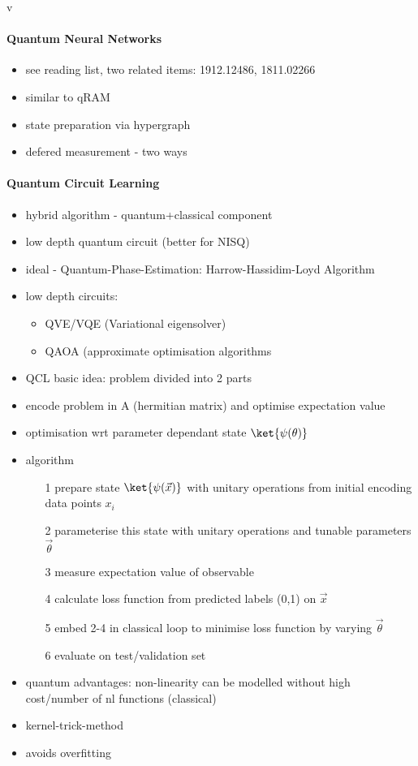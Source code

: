 v

\paragraph{Quantum Neural Networks}
\begin{itemize}
  \item see reading list, two related items: 1912.12486, 1811.02266
  \item similar to qRAM
  \item state preparation via hypergraph
  \item defered measurement - two ways
\end{itemize}

\paragraph{Quantum Circuit Learning}
\begin{itemize}
  \item hybrid algorithm - quantum+classical component
  \item low depth quantum circuit (better for NISQ)
  \item ideal - Quantum-Phase-Estimation: Harrow-Hassidim-Loyd Algorithm
  \item low depth circuits:
\begin{itemize}
  \item  QVE/VQE (Variational eigensolver)
  \item  QAOA (approximate optimisation algorithms
\end{itemize}
  \item QCL basic idea: problem divided into 2 parts
  \item encode problem in A (hermitian matrix) and optimise expectation value
  \item optimisation wrt parameter dependant state $\ket{\psi(\theta)}$
  \item algorithm
\begin{itemize}
  \item[1] prepare state $\ket{\psi(\vec{x})}$ with unitary operations from initial encoding data points $x_i$
  \item[2] parameterise this state with unitary operations and tunable parameters $\vec{\theta}$
  \item[3] measure expectation value of observable
  \item[4] calculate loss function from predicted labels (0,1) on $\vec{x}$
  \item[5] embed 2-4 in classical loop to minimise loss function by varying $\vec{\theta}$
  \item[6] evaluate on test/validation set
\end{itemize}
  \item quantum advantages: non-linearity can be modelled without high cost/number of nl functions (classical)
  \item kernel-trick-method
  \item avoids overfitting
\end{itemize}

